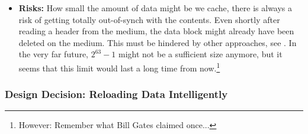 \begin{itemize}
	\item \textbf{Risks:} How small the amount of data might be we cache, there is always a risk of getting totally out-of-synch with the \TERMmedium{} contents. Even shortly after reading a header from the medium, the data block might already have been deleted on the medium. This must be hindered by other approaches, see . In the very far future, $2^{63}-1$ might not be a sufficient size anymore, but it seems that this limit would last a long time from now.\footnote{However: Remember what Bill Gates claimed once...}
\end{itemize}


\subsubsection{Design Decision: Reloading Data Intelligently}
\label{sec:ReloadingPolicy}


